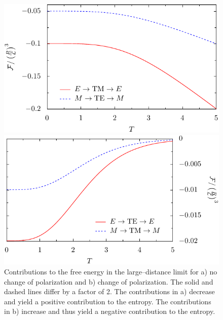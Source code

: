 \begin{figure}
  \begin{minipage}[b]{.5\linewidth}
  \centering
  \includegraphics[scale=0.74]{plots/tetm_nochange_ld.pdf}
  \end{minipage}%
  \begin{minipage}[b]{.5\linewidth}
  \centering
  \includegraphics[scale=0.74]{plots/tetm_change_ld.pdf}
  \end{minipage}

  \caption{Contributions to the free energy in the large--distance limit for a)
  no change of polarization and b) change of polarization. The solid and dashed
  lines differ by a factor of 2. The contributions in a) decrease and yield
  a positive contribution to the entropy. The contributions in b) increase and
  thus yield a negative contribution to the entropy.}
  \label{fig:ld_F_contrib}
\end{figure}

